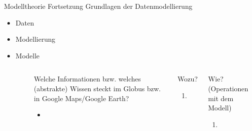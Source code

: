\begin{frame}{Modelltheorie Fortsetzung}
Grundlagen der Datenmodellierung
\begin{itemize}\small
    \item Daten
    \item Modellierung 
    \item Modelle
\end{itemize}
\begin{columns}[T,onlytextwidth]

    \begin{block}{\cite[131]{stachowiak}}
        \begin{quote}
        
        \end{quote}
    \end{block}
\begin{exampleblock}{\footnotesize Welche Informationen bzw. welches (abstrakte) Wissen steckt im Globus bzw. in Google Maps/Google Earth? }
    \begin{itemize}\footnotesize
        \item 
    \end{itemize}
\end{exampleblock}

\begin{alertblock}{Wozu?}
\begin{enumerate}\small
    \item 
\end{enumerate}
\end{alertblock}

\begin{alertblock}{Wie? (Operationen mit dem Modell)}
\begin{enumerate}\small
    \item 
\end{enumerate}
\end{alertblock}
\end{columns}

\end{frame}


